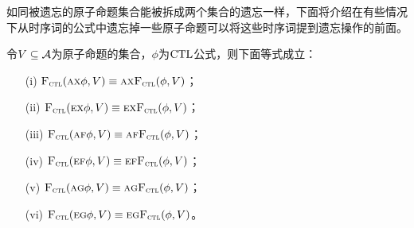 如同被遗忘的原子命题集合能被拆成两个集合的遗忘一样，下面将介绍在有些情况下从时序词的公式中遗忘掉一些原子命题可以将这些时序词提到遗忘操作的前面。
\begin{proposition}
	令$V\subseteq {\cal A}$为原子命题的集合，$\phi$为$\textrm{CTL}$公式，则下面等式成立：
	\begin{itemize}
		\item[(i)] ${\textsc{F}_{\textsc{ctl}}}(\textsc{a}\textsc{x}\phi,V) \equiv \textsc{a} \textsc{x}{\textsc{F}_{\textsc{ctl}}}(\phi,V)$；
		\item[(ii)] ${\textsc{F}_{\textsc{ctl}}}(\textsc{e}\textsc{x}\phi,V) \equiv \textsc{e} \textsc{x}{\textsc{F}_{\textsc{ctl}}}(\phi,V)$；
		\item[(iii)] ${\textsc{F}_{\textsc{ctl}}}(\textsc{a}\textsc{f}\phi,V) \equiv \textsc{a}\textsc{f}{\textsc{F}_{\textsc{ctl}}}(\phi,V)$；
		\item[(iv)] ${\textsc{F}_{\textsc{ctl}}}(\textsc{e}\textsc{f}\phi,V) \equiv \textsc{e}\textsc{f}{\textsc{F}_{\textsc{ctl}}}(\phi,V)$；
		\item[(v)] ${\textsc{F}_{\textsc{ctl}}}(\textsc{a} \textsc{g}\phi,V)\equiv \textsc{a} \textsc{g}{\textsc{F}_{\textsc{ctl}}}(\phi,V)$；
		\item[(vi)] ${\textsc{F}_{\textsc{ctl}}}(\textsc{e}\textsc{g}\phi,V)\equiv\textsc{e}\textsc{g} {\textsc{F}_{\textsc{ctl}}}(\phi,V)$。
	\end{itemize}
\end{proposition}
